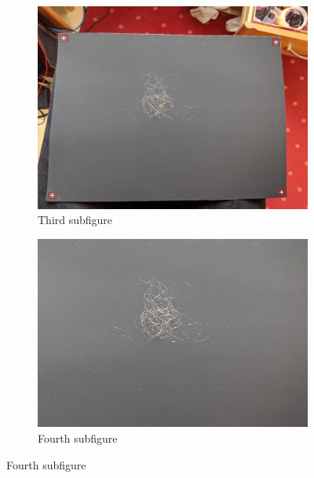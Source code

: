 \documentclass[german,a4paper, 12pt]{scrartcl}
\begin{document}
\begin{figure}[H]
	\medskip
	\begin{subfigure}{0.48\textwidth}
		\includegraphics[width=\linewidth]{figBina/02foundDots.png}
		\caption{Third subfigure} \label{fig:c}
	\end{subfigure}\hspace*{\fill}
	\begin{subfigure}{0.48\textwidth}
		\includegraphics[width=\linewidth]{figBina/03crop image.png}
		\caption{Fourth subfigure} \label{fig:d}
	\end{subfigure}
	

\end{figure}
\end{document}
